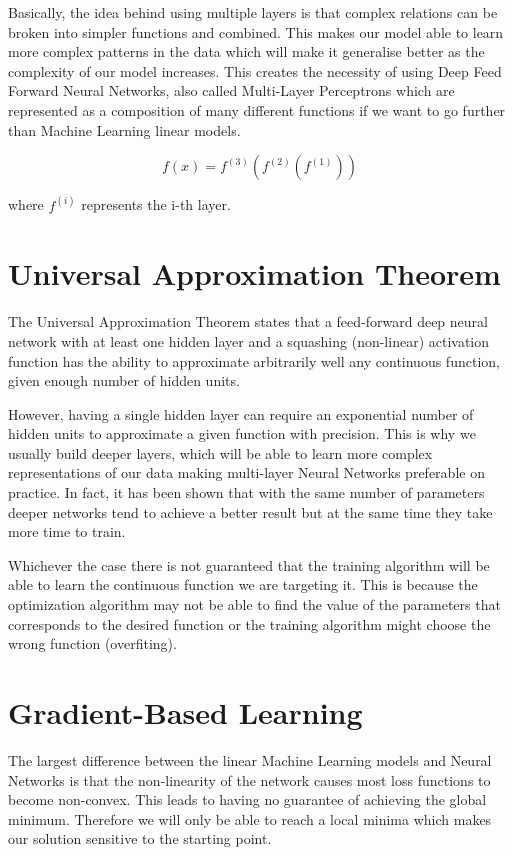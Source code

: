 \noindent Basically, the idea behind using multiple layers is that complex relations can be broken into simpler functions and combined. This makes our model able to learn more complex patterns in the data which will make it generalise better as the complexity of our model increases. This creates the necessity of using Deep Feed Forward Neural Networks, also called Multi-Layer Perceptrons which are represented as a composition of many different functions if we want to go further than Machine Learning linear models.

$$ f(x) = f^{(3)} \left(f^{(2)}\left(f^{(1)}\right)\right)$$

where $f^{(i)}$ represents the i-th layer.

\newpage
\section{Universal Approximation Theorem}

The Universal Approximation Theorem states that a feed-forward deep neural network with at least one hidden layer and a squashing (non-linear) activation function has the ability to approximate arbitrarily well any continuous function, given enough number of hidden units.

However, having a single hidden layer can require an exponential number of hidden units to approximate a given function with precision. This is why we usually build deeper layers, which will be able to learn more complex representations of our data making multi-layer Neural Networks preferable on practice. In fact, it has been shown that with the same number of parameters deeper networks tend to achieve a better result but at the same time they take more time to train.

Whichever the case there is not guaranteed that the training algorithm will be able to learn the continuous function we are targeting it. This is because the optimization algorithm may not be able to find the value of the parameters that corresponds to the desired function or the training algorithm might choose the wrong function (overfiting). 

\section{Gradient-Based Learning}

The largest difference between the linear Machine Learning models and Neural Networks is that the non-linearity of the network causes most loss functions to become non-convex. This leads to having no guarantee of achieving the global minimum. Therefore we will only be able to reach a local minima which makes our solution sensitive to the starting point.

